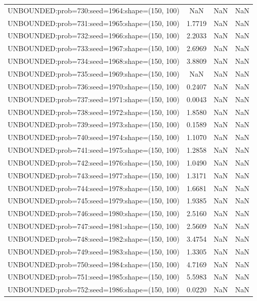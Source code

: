 \begin{longtable}{lccc}
UNBOUNDED:prob=730:seed=1964:shape=(150, 100) &     NaN &   NaN &    NaN \\
UNBOUNDED:prob=731:seed=1965:shape=(150, 100) &  1.7719 &   NaN &    NaN \\
UNBOUNDED:prob=732:seed=1966:shape=(150, 100) &  2.2033 &   NaN &    NaN \\
UNBOUNDED:prob=733:seed=1967:shape=(150, 100) &  2.6969 &   NaN &    NaN \\
UNBOUNDED:prob=734:seed=1968:shape=(150, 100) &  3.8809 &   NaN &    NaN \\
UNBOUNDED:prob=735:seed=1969:shape=(150, 100) &     NaN &   NaN &    NaN \\
UNBOUNDED:prob=736:seed=1970:shape=(150, 100) &  0.2407 &   NaN &    NaN \\
UNBOUNDED:prob=737:seed=1971:shape=(150, 100) &  0.0043 &   NaN &    NaN \\
UNBOUNDED:prob=738:seed=1972:shape=(150, 100) &  1.8580 &   NaN &    NaN \\
UNBOUNDED:prob=739:seed=1973:shape=(150, 100) &  0.1589 &   NaN &    NaN \\
UNBOUNDED:prob=740:seed=1974:shape=(150, 100) &  1.1070 &   NaN &    NaN \\
UNBOUNDED:prob=741:seed=1975:shape=(150, 100) &  1.2858 &   NaN &    NaN \\
UNBOUNDED:prob=742:seed=1976:shape=(150, 100) &  1.0490 &   NaN &    NaN \\
UNBOUNDED:prob=743:seed=1977:shape=(150, 100) &  1.3171 &   NaN &    NaN \\
UNBOUNDED:prob=744:seed=1978:shape=(150, 100) &  1.6681 &   NaN &    NaN \\
UNBOUNDED:prob=745:seed=1979:shape=(150, 100) &  1.9385 &   NaN &    NaN \\
UNBOUNDED:prob=746:seed=1980:shape=(150, 100) &  2.5160 &   NaN &    NaN \\
UNBOUNDED:prob=747:seed=1981:shape=(150, 100) &  2.5609 &   NaN &    NaN \\
UNBOUNDED:prob=748:seed=1982:shape=(150, 100) &  3.4754 &   NaN &    NaN \\
UNBOUNDED:prob=749:seed=1983:shape=(150, 100) &  1.3305 &   NaN &    NaN \\
UNBOUNDED:prob=750:seed=1984:shape=(150, 100) &  4.7169 &   NaN &    NaN \\
UNBOUNDED:prob=751:seed=1985:shape=(150, 100) &  5.5983 &   NaN &    NaN \\
UNBOUNDED:prob=752:seed=1986:shape=(150, 100) &  0.0220 &   NaN &    NaN \\

\end{longtable}
